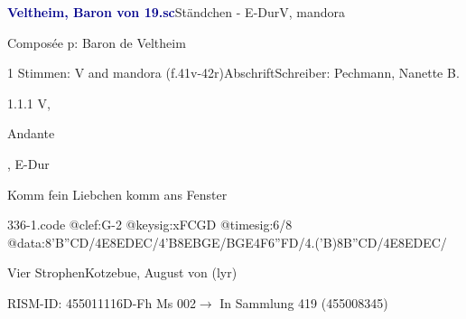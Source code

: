 \documentclass[twocolumn]{book}
\begin{document}
\par \vspace{7pt} \textcolor{darkblue}{\textbf{Veltheim, Baron von  19.sc}}\hfillplus{\textbf{[336]}}\newline Ständchen - E-Dur\newline V, mandora
\par \begin{itshape}[heading, f.41v:] Composée p: Baron de Veltheim\end{itshape} 
\par \textcolor{darkblue}{}  1 Stimmen: V and mandora  (f.41v-42r)\newline Abschrift\newline Schreiber: Pechmann, Nanette B.
\par 1.1.1  V, \begin{itshape}Andante\end{itshape}, E-Dur\newline \begin{footnotesize} Komm fein Liebchen komm ans Fenster \end{footnotesize}  
\begin{filecontents*}{336-1.code}
@clef:G-2
@keysig:xFCGD
@timesig:6/8
@data:{8'B''C}D/4E8E{DE}C/4'B8E{BG}E/{BG}E4F{6''FD}/4.('B){8B''C}D/4E8E{DE}C/
\end{filecontents*}
\newline
%
\par Vier Strophen\newline Kotzebue, August von  (lyr)
\par RISM-ID: 455011116\newline D-Fh  Ms 002\newline $\rightarrow$ In Sammlung 419 (455008345)
      
\end{document}
